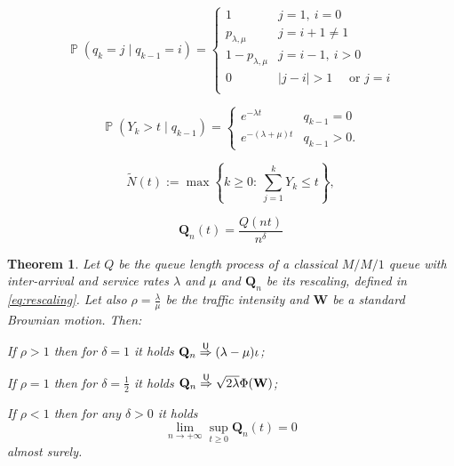 \documentclass[10pt,a4paper]{amsart}
\newtheorem{thm}{Theorem}
\DeclareMathOperator{\bP}{\mathbb{P}}
\begin{document}
\begin{equation}\label{eq:mCren1}
	\bP(q_k=j \mid q_{k-1}=i)=\begin{cases}
		1 & j=1, \ i=0 \\
		p_{\lambda,\mu} & j=i+1 \not = 1 \\
		1-p_{\lambda,\mu} & j=i-1, \ i>0\\
		0 & |j-i|>1 \quad \mbox{ or } j=i \\
	\end{cases}
\end{equation}

\begin{equation}\label{eq:Y1}
	\bP(Y_k>t\mid q_{k-1})=\begin{cases} e^{-\lambda t} & q_{k-1}=0 \\
		e^{-(\lambda+\mu)t} & q_{k-1}>0.
	\end{cases}
\end{equation}

\begin{equation}\label{eq:countingproc}
	\widetilde{N}(t):=\max\left\{k \ge 0: \ \sum_{j=1}^{k}Y_k \le t\right\},
\end{equation}

\begin{equation}\label{eq:rescaling}
	\mathbf{Q}_n(t)=\frac{Q(nt)}{n^\delta}
\end{equation}

\begin{thm}\label{thm:classscal}
	Let $Q$ be the queue length process of a classical $M/M/1$ queue with inter-arrival and service rates $\lambda$ and $\mu$ and $\mathbf{Q}_n$ be its rescaling, defined in \eqref{eq:rescaling}. Let also $\rho=\frac{\lambda}{\mu}$ be the traffic intensity and $\mathbf{W}$ be a standard Brownian motion. Then:
	\begin{itemize}
		\item[$(i)$] If $\rho>1$ then for $\delta=1$ it holds $\mathbf{Q}_n \overset{\sf U}{\Rightarrow} (\lambda-\mu)\iota$;
		\item[$(ii)$] If $\rho=1$ then for $\delta=\frac{1}{2}$ it holds $\mathbf{Q}_n \overset{\sf U}{\Rightarrow} \sqrt{2\lambda}\Phi(\mathbf{W})$;
		{\item[$(iii)$] If $\rho<1$ then for any $\delta>0$ it holds 
		\begin{equation*}
			\lim_{n \to +\infty}\sup_{t \ge 0}\mathbf{Q}_n(t)=0
			\end{equation*}
		almost surely.}
		\end{itemize}
\end{thm}
\end{document}
